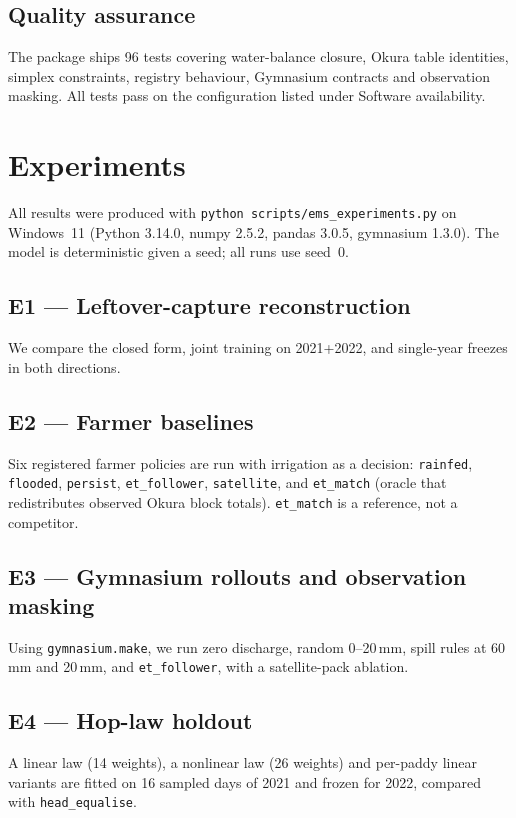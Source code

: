 \documentclass[preprint,12pt,authoryear,review]{elsarticle}
\begin{document}
\subsection{Quality assurance}

The package ships 96 tests covering water-balance closure, Okura table identities, simplex constraints, registry behaviour, Gymnasium contracts and observation masking. All tests pass on the configuration listed under Software availability.

\section{Experiments}
\label{sec:exp}

All results were produced with \texttt{python scripts/ems\_experiments.py} on Windows~11 (Python 3.14.0, numpy 2.5.2, pandas 3.0.5, gymnasium 1.3.0). The model is deterministic given a seed; all runs use seed~0.

\subsection{E1 --- Leftover-capture reconstruction}
We compare the closed form, joint training on 2021+2022, and single-year freezes in both directions.

\subsection{E2 --- Farmer baselines}
Six registered farmer policies are run with irrigation as a decision: \texttt{rainfed}, \texttt{flooded}, \texttt{persist}, \texttt{et\_follower}, \texttt{satellite}, and \texttt{et\_match} (oracle that redistributes observed Okura block totals). \texttt{et\_match} is a reference, not a competitor.

\subsection{E3 --- Gymnasium rollouts and observation masking}
\label{sec:e3}
Using \texttt{gymnasium.make}, we run zero discharge, random 0--20\,mm, spill rules at 60\,mm and 20\,mm, and \texttt{et\_follower}, with a satellite-pack ablation.

\subsection{E4 --- Hop-law holdout}
\label{sec:e4}
A linear law (14 weights), a nonlinear law (26 weights) and per-paddy linear variants are fitted on 16 sampled days of 2021 and frozen for 2022, compared with \texttt{head\_equalise}.
\end{document}
